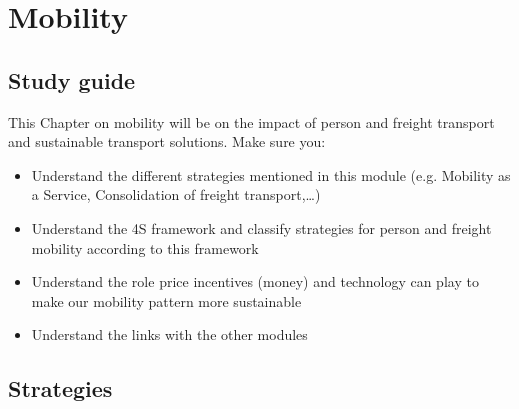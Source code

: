 \documentclass[../summary.tex]{subfiles}
\begin{document}
	
	\section{Mobility}
	
	\subsection{Study guide}
	
	This Chapter on mobility will be on the impact of person and freight transport and sustainable transport solutions. Make sure you:
	\begin{itemize}
	\item Understand the different strategies mentioned in this module (e.g. Mobility as a Service, Consolidation of freight transport,…)
	\item Understand the 4S framework and classify strategies for person and freight mobility according to this framework
	\item Understand the role price incentives (money) and technology can play to make our mobility pattern more sustainable
	\item Understand the links with the other modules
	\end{itemize}
	
	\subsection{Strategies}
	
\end{document}
